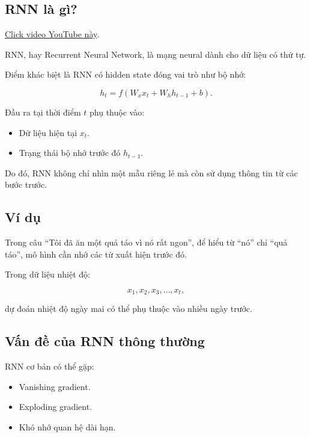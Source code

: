 \documentclass[12pt,a4paper]{report}
\begin{document}
\subsection{RNN là gì?}

\href{https://www.youtube.com/watch?v=a4G3UaDaMwQ}{Click video YouTube này}.

RNN, hay Recurrent Neural Network, là mạng neural dành cho dữ liệu có thứ tự.

Điểm khác biệt là RNN có hidden state đóng vai trò như bộ nhớ:

\begin{equation}
h_t
=
f(W_xx_t+W_hh_{t-1}+b).
\end{equation}

Đầu ra tại thời điểm \(t\) phụ thuộc vào:

\begin{itemize}[leftmargin=1.5em]
    \item Dữ liệu hiện tại \(x_t\).
    \item Trạng thái bộ nhớ trước đó \(h_{t-1}\).
\end{itemize}

Do đó, RNN không chỉ nhìn một mẫu riêng lẻ mà còn sử dụng thông tin từ các bước trước.

\subsection{Ví dụ}

Trong câu ``Tôi đã ăn một quả táo vì nó rất ngon'', để hiểu từ ``nó'' chỉ ``quả táo'', mô hình cần nhớ các từ xuất hiện trước đó.

Trong dữ liệu nhiệt độ:

\begin{equation}
x_1,x_2,x_3,\ldots,x_t,
\end{equation}

dự đoán nhiệt độ ngày mai có thể phụ thuộc vào nhiều ngày trước.

\subsection{Vấn đề của RNN thông thường}

RNN cơ bản có thể gặp:

\begin{itemize}[leftmargin=1.5em]
    \item Vanishing gradient.
    \item Exploding gradient.
    \item Khó nhớ quan hệ dài hạn.
\end{itemize}
\end{document}
